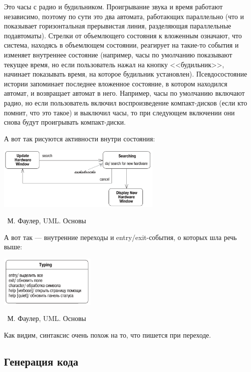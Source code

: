 \documentclass[a5paper]{article}
\newcommand{\attribution}[1] {
	\vspace{-5mm}\begin{flushright}\begin{scriptsize}%
	{\textcopyright\, #1}\end{scriptsize}\end{flushright}
}
\begin{document}
Это часы с радио и будильником. Проигрывание звука и время работают независимо, поэтому по сути это два автомата, работающих параллельно (что и показывает горизонтальная прерывистая линия, разделяющая параллельные подавтоматы). Стрелки от объемлющего состояния к вложенным означают, что система, находясь в объемлющем состоянии, реагирует на такие-то события и изменяет внутреннее состояние (например, часы по умолчанию показывают текущее время, но если пользователь нажал на кнопку <<будильник>>, начинает показывать время, на которое будильник установлен). Псевдосостояние истории запоминает последнее вложенное состояние, в котором находился автомат, и возвращает автомат в него. Например, часы по умолчанию включают радио, но если пользователь включил воспроизведение компакт-дисков (если кто помнит, что это такое) и выключил часы, то при следующем включении они снова будут проигрывать компакт-диски.

А вот так рисуются активности внутри состояния:

\begin{center}
	\includegraphics[width=0.6\textwidth]{stateTransitionInternalEventExample.png}
	\attribution{М. Фаулер, UML. Основы}
\end{center}

А вот так --- внутренние переходы и entry/exit-события, о которых шла речь выше:

\begin{center}
	\includegraphics[width=0.35\textwidth]{stateTransitionInternalEvents.png}
	\attribution{М. Фаулер, UML. Основы}
\end{center}

Как видим, синтаксис очень похож на то, что пишется при переходе.

\subsection{Генерация кода}
\end{document}
